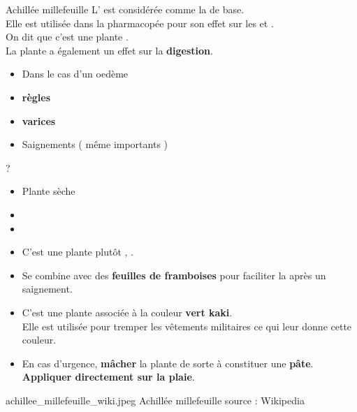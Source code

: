 
\ficheidentiteplante
{Achillée millefeuille}
{%
    L' est considérée comme la  de base.\\ 
    Elle est utilisée dans la pharmacopée pour son effet sur les  et .\\
    On dit que c'est une plante .\\

    La plante a également un effet sur la \textbf{digestion}.
}
{%
    \begin{itemize}[label = \bcplume]
        \item Dans le cas d'un oedème
        \item \textbf{règles}
        \item \textbf{varices}
        \item Saignements ( même importants )
    \end{itemize}
}
{%
    ?
}
{%
    \begin{itemize}[label = \bccrayon]
        \item Plante sèche
        \item {}
        \item {}
    \end{itemize}
}
{%
    \begin{itemize}[label = \bcplume]
        \item C'est une plante plutôt , .
        \item Se combine avec des \textbf{feuilles de framboises} pour faciliter la  après un saignement.
        \item C'est une plante  associée à la couleur \textbf{vert kaki}.\\Elle est utilisée pour tremper les vêtements militaires ce qui leur donne cette couleur. 
        \item[\bcattention] En cas d'urgence, \textbf{mâcher} la plante de sorte à constituer une \textbf{pâte}.\\ \textbf{Appliquer directement sur la plaie}.
    \end{itemize}
}
{%
    achillee_millefeuille_wiki.jpeg
}
{%
    Achillée millefeuille
}
{%
    source : Wikipedia 
}

